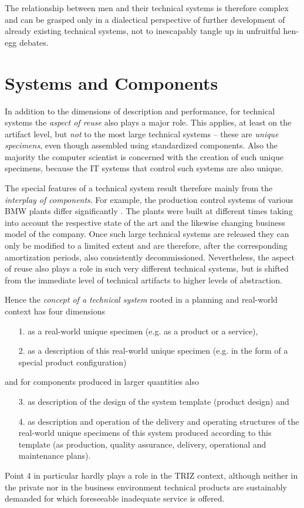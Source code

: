\documentclass[11pt,a4paper]{article}
\begin{document}
The relationship between men and their technical systems is therefore complex
and can be grasped only in a dialectical perspective of further development of
already existing technical systems, not to inescapably tangle up in unfruitful
hen-egg debates. 

\section{Systems and Components}

In addition to the dimensions of description and performance, for technical
systems the \emph{aspect of reuse} also plays a major role. This applies, at
least on the artifact level, but \emph{not} to the most large technical
systems -- these are \emph{unique specimens}, even though assembled using
standardized components. Also the majority the computer scientist is concerned
with the creation of such unique specimens, because the IT systems that
control such systems are also unique. 

The special features of a technical system result therefore mainly from the
\emph{interplay of components}. For example, the production control systems of
various BMW plants differ significantly \cite{Kropik2009}. The plants were
built at different times taking into account the respective state of the art
and the likewise changing business model of the company. Once such large
technical systems are released they can only be modified to a limited extent
and are therefore, after the corresponding amortization periods, also
consistently decommissioned. Nevertheless, the aspect of reuse also plays a
role in such very different technical systems, but is shifted from the
immediate level of technical artifacts to higher levels of abstraction.

Hence the \emph{concept of a technical system} rooted in a planning and
real-world context has four dimensions
\begin{itemize}[noitemsep]
\item [1.] as a real-world unique specimen (e.g. as a product or a service),
\item [2.] as a description of this real-world unique specimen (e.g. in the
  form of a special product configuration)
\end{itemize}
and for components produced in larger quantities also
\begin{itemize}[noitemsep]
\item [3.] as description of the design of the system template (product
  design) and
\item [4.] as description and operation of the delivery and operating
  structures of the real-world unique specimens of this system produced
  according to this template (as production, quality assurance, delivery,
  operational and maintenance plans).
\end{itemize}
Point 4 in particular hardly plays a role in the TRIZ context, although
neither in the private nor in the business environment technical products are
sustainably demanded for which foreseeable inadequate service is offered.
\end{document}
